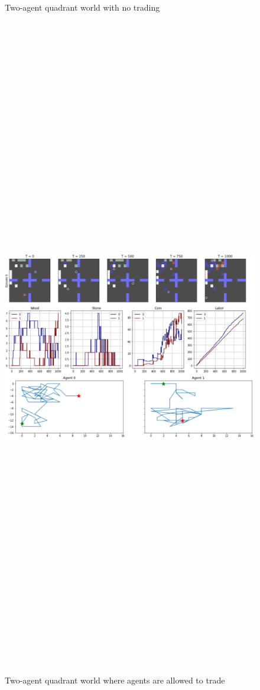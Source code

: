 \documentclass[final]{beamer}
\newlength{\twocolwid}
\begin{document}
\begin{frame}[t]
\begin{columns}[t]
\begin{column}{\twocolwid}
\begin{figure}
\caption{Two-agent quadrant world with no trading}
\end{figure}
\begin{figure}
\includegraphics[height = 32.5cm]{figs/quadrant-trading2.png}
\caption{Two-agent quadrant world where agents are allowed to trade}
\end{figure}


\end{column}
\end{columns}
\end{frame}
\end{document}
